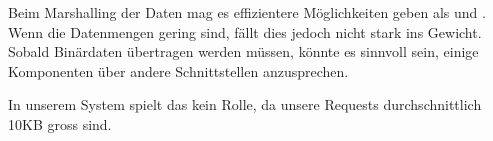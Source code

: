 Beim \gls{Marshalling} der Daten mag es effizientere Möglichkeiten geben als  und .
Wenn die Datenmengen gering sind, fällt dies jedoch nicht stark ins Gewicht.
Sobald Binärdaten übertragen werden müssen, könnte es sinnvoll sein, einige Komponenten über andere Schnittstellen anzusprechen.

In unserem System spielt das kein Rolle, da unsere Requests durchschnittlich 10KB gross sind.